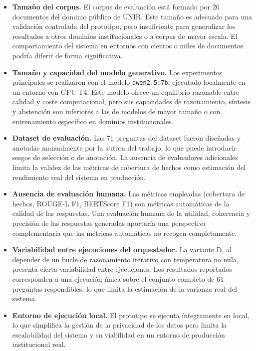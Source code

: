 \begin{itemize}
    \item \textbf{Tamaño del corpus.} El corpus de evaluación está formado por 26 documentos del dominio público de UNIR. 
    Este tamaño es adecuado para una validación controlada del prototipo, pero insuficiente para generalizar los resultados a otros dominios institucionales o a corpus de mayor escala. 
    El comportamiento del sistema en entornos con cientos o miles de documentos podría diferir de forma significativa.

    \item \textbf{Tamaño y capacidad del modelo generativo.} Los experimentos principales se realizaron con el modelo \texttt{qwen2.5:7b}, ejecutado localmente en un entorno con GPU T4. 
    Este modelo ofrece un equilibrio razonable entre calidad y coste computacional, pero sus capacidades de razonamiento, síntesis y abstención son inferiores a las de modelos de mayor tamaño o con entrenamiento específico en dominios institucionales. 

    \item \textbf{Dataset de evaluación.} Las 71 preguntas del dataset fueron diseñadas y anotadas manualmente por la autora del trabajo, lo que puede introducir sesgos de selección o de anotación. 
    La ausencia de evaluadores adicionales limita la validez de las métricas de cobertura de hechos como estimación del rendimiento real del sistema en producción.

    \item \textbf{Ausencia de evaluación humana.} Las métricas empleadas (cobertura de hechos, ROUGE-L F1, BERTScore F1) son métricas automáticas de la calidad de las respuestas. 
    Una evaluación humana de la utilidad, coherencia y precisión de las respuestas generadas aportaría una perspectiva complementaria que las métricas automáticas no recogen completamente.

    \item \textbf{Variabilidad entre ejecuciones del orquestador.} La variante D, al depender de un bucle de razonamiento iterativo con temperatura no nula, presenta cierta variabilidad entre ejecuciones.
    Los resultados reportados corresponden a una ejecución única sobre el conjunto completo de 61 preguntas respondibles, lo que limita la estimación de la varianza real del sistema.

    \item \textbf{Entorno de ejecución local.} El prototipo se ejecuta íntegramente en local, lo que simplifica la gestión de la privacidad de los datos pero limita la escalabilidad del sistema y su viabilidad en un entorno de producción institucional real.
\end{itemize}

